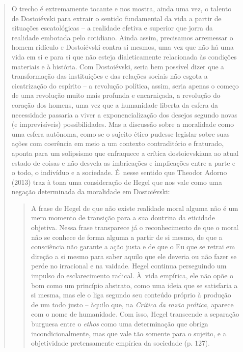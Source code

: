 {\begin{quote}
O trecho é extremamente tocante e nos mostra, ainda uma vez, o talento
de Dostoiévski para extrair o sentido fundamental da vida a partir de
situações escatológicas -- a realidade efetiva e superior que jorra da
realidade embotada pelo cotidiano. Ainda assim, precisamos arremessar o
homem ridículo e Dostoiévski contra si mesmos, uma vez que não há uma
vida em si e para si que não esteja dialeticamente relacionada às
condições materiais e à história. Com Dostoiévski, seria bem possível
dizer que a transformação das instituições e das relações sociais não
esgota a cicatrização do espírito -- a revolução política, assim, seria
apenas o começo de uma revolução muito mais profunda e encarniçada, a
revolução do coração dos homens, uma vez que a humanidade liberta da
esfera da necessidade passaria a viver a exponencialização dos desejos
segundo novas (e imprevisíveis) possibilidades. Mas a discussão sobre a
moralidade como uma esfera autônoma, como se o sujeito ético pudesse
legislar sobre suas ações com coerência em meio a um contexto
contraditório e fraturado, aponta para um solipsismo que enfraquece a
crítica dostoievskiana ao atual estado de coisas e não desvela as
imbricações e implicações entre a parte e o todo, o indivíduo e a
sociedade. É~nesse sentido que Theodor Adorno (2013) traz à tona uma
consideração de Hegel que nos vale como uma negação determinada da
moralidade em Dostoiévski:

\begin{quote}
A frase de Hegel de que não existe realidade moral alguma não é um mero
momento de transição para a sua doutrina da eticidade objetiva. Nessa
frase transparece já o reconhecimento de que o moral não se conhece de
forma alguma a partir de si mesmo, de que a consciência não garante a
ação justa e de que o Eu que se retrai em direção a si mesmo para saber
aquilo que ele deveria ou não fazer se perde no irracional e na vaidade.
Hegel continua perseguindo um impulso do esclarecimento radical. À~vida
empírica, ele não opõe o bom como um princípio abstrato, como uma ideia
que se satisfaria a si mesma, mas ele o liga segundo seu conteúdo
próprio à produção de um todo justo -- àquilo que, na \emph{Crítica da
razão prática}, aparece com o nome de humanidade. Com isso, Hegel
transcende a separação burguesa entre o \emph{ethos} como uma
determinação que obriga incondicionalmente, mas que vale tão somente
para o sujeito, e a objetividade pretensamente empírica da sociedade (p.
127).
\end{quote}


\end{quote}}
